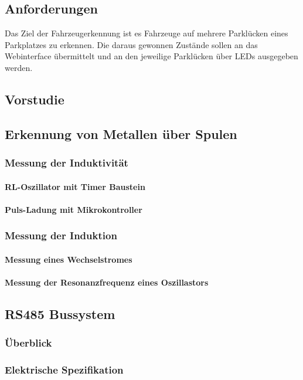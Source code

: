 \def \sectionauthors {Dennis Köb}
\subsection{Anforderungen}
Das Ziel der Fahrzeugerkennung ist es Fahrzeuge auf mehrere Parklücken eines Parkplatzes zu erkennen. Die daraus 
gewonnen Zustände sollen an das Webinterface übermittelt und an den jeweilige Parklücken über LEDs ausgegeben werden. 
\subsection{Vorstudie}

\subsection{Erkennung von Metallen über Spulen}
\subsubsection{Messung der Induktivität}
\paragraph{RL-Oszillator mit Timer Baustein}
\paragraph{Puls-Ladung mit Mikrokontroller}
\subsubsection{Messung der Induktion}
\paragraph{Messung eines Wechselstromes}
\paragraph{Messung der Resonanzfrequenz eines Oszillastors}

\subsection{RS485 Bussystem}
\subsubsection{Überblick}
\subsubsection{Elektrische Spezifikation}
